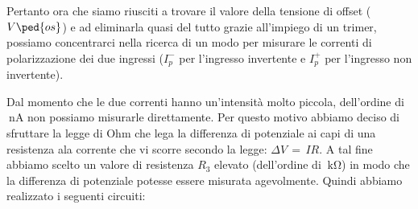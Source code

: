 Pertanto ora che siamo riusciti a trovare il valore della tensione di offset ($V\ped{os}$) e ad eliminarla quasi del tutto grazie all'impiego di un trimer, possiamo concentrarci nella ricerca di un modo per misurare le correnti di polarizzazione dei due ingressi ($I_{p}^-$ per l'ingresso invertente e $I_{p}^+$ per l'ingresso non invertente).

Dal momento che le due correnti hanno un'intensità molto piccola, dell'ordine di $\SI{}{\nano\ampere}$ non possiamo misurarle direttamente. Per questo motivo abbiamo deciso di sfruttare la legge di Ohm che lega la differenza di potenziale ai capi di una resistenza ala corrente che vi scorre secondo la legge: $\Delta V\,=\,IR$. A tal fine abbiamo scelto un valore di resistenza $R_3$ elevato (dell'ordine di $\SI{}{\kilo\ohm}$) in modo che la differenza di potenziale potesse essere misurata agevolmente. Quindi abbiamo realizzato i seguenti circuiti:

